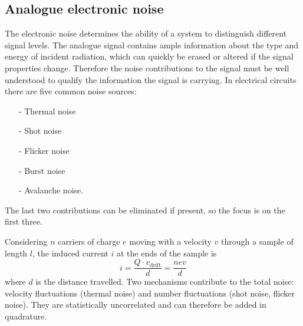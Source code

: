 \subsection{Analogue electronic noise}
The electronic noise determines the ability of a system to distinguish different signal levels. The analogue signal contains ample information about the type and energy of incident radiation, which can quickly be erased or altered if the signal properties change. Therefore the noise contributions to the signal must be well understood to qualify the information the signal is carrying. In electrical circuits there are five common noise sources:
\begin{itemize}
\item[-]Thermal noise
\item[-]Shot noise
\item[-]Flicker noise
\item[-]Burst noise
\item[-]Avalanche noise.
\end{itemize}
The last two contributions can be eliminated if present, so the focus is on the first three.

Considering $n$ carriers of charge $e$ moving with a velocity $v$ through a sample of length $l$, the induced current $i$ at the ends of the sample is
\begin{equation}
i = \frac {Q \cdot v_\mathrm{drift}} {d}  = \frac {n e v } {d}
\end{equation}
where $d$ is the distance travelled. Two mechanisms contribute to the total noise: velocity fluctuations (thermal noise) and number fluctuations (shot noise, flicker noise). They are statistically uncorrelated and can therefore be added in quadrature.

